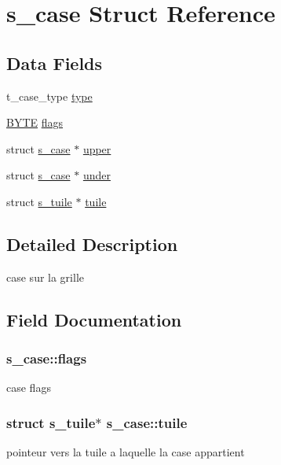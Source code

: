 \hypertarget{structs__case}{}\section{s\+\_\+case Struct Reference}
\label{structs__case}
\subsection*{Data Fields}
\begin{DoxyCompactItemize}
\item 
t\+\_\+case\+\_\+type \hyperlink{structs__case_a4c656b1851b67d43646011c5790f7f69}{type}
\item 
\hyperlink{types_8h_aec93e83855ac17c3c25c55c37ca186dd}{B\+Y\+TE} \hyperlink{structs__case_a39225531c7109b07ffaa9e67c5ee4e6c}{flags}
\item 
struct \hyperlink{structs__case}{s\+\_\+case} $\ast$ \hyperlink{structs__case_a5e98a39abc778b8e24c6f3ac0c447535}{upper}
\item 
struct \hyperlink{structs__case}{s\+\_\+case} $\ast$ \hyperlink{structs__case_a78554a4a011ef2fca3d8542312f64870}{under}
\item 
struct \hyperlink{structs__tuile}{s\+\_\+tuile} $\ast$ \hyperlink{structs__case_abe85be2fa16dd0f19b1b7051dfc84620}{tuile}
\end{DoxyCompactItemize}


\subsection{Detailed Description}
case sur la grille 

\subsection{Field Documentation}
\subsubsection[{\texorpdfstring{flags}{flags}}]{ s\+\_\+case\+::flags}\hypertarget{structs__case_a39225531c7109b07ffaa9e67c5ee4e6c}{}\label{structs__case_a39225531c7109b07ffaa9e67c5ee4e6c}
case flags 
\subsubsection[{\texorpdfstring{tuile}{tuile}}]{\setlength{\rightskip}{0pt plus 5cm}struct {\bf s\+\_\+tuile}$\ast$ s\+\_\+case\+::tuile}\hypertarget{structs__case_abe85be2fa16dd0f19b1b7051dfc84620}{}\label{structs__case_abe85be2fa16dd0f19b1b7051dfc84620}
pointeur vers la tuile a laquelle la case appartient 

